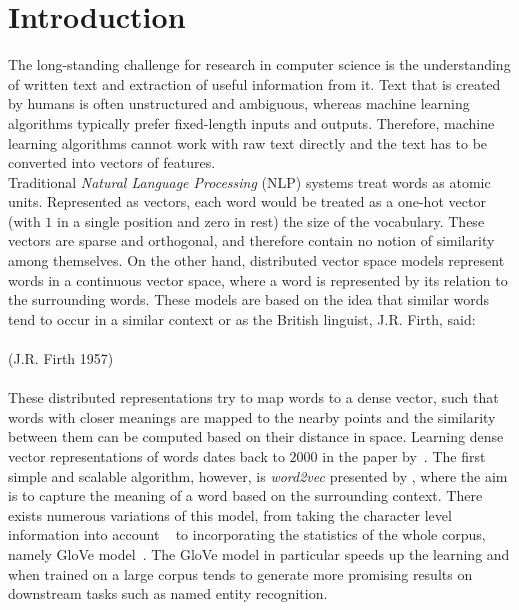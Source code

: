 \chapter{Introduction}\label{chap:intro}
The long-standing challenge for research in computer science is the understanding of written text and extraction of useful information from it. Text that is created by humans is often unstructured and ambiguous, whereas machine learning algorithms typically prefer fixed-length inputs and outputs. Therefore, machine learning algorithms cannot work with raw text directly and the text has to be converted into vectors of features.
\\
Traditional \emph{Natural Language Processing} (NLP) systems treat words as atomic units. Represented as vectors, each word would be treated as a one-hot vector (with $1$ in a single position and zero in rest) the size of the vocabulary. These vectors are sparse and orthogonal, and therefore contain no notion of similarity among themselves. On the other hand, distributed vector space models represent words in a continuous vector space, where a word is represented by its relation to the surrounding words. These models are based on the idea that similar words tend to occur in a similar context or as the British linguist, J.R. Firth, said:\\ \\
\noindent
{} (J.R. Firth 1957)\\
\\
These distributed representations try to map words to a dense vector, such that words with closer meanings are mapped to the nearby points and the similarity between them can be computed based on their distance in space.
Learning dense vector representations of words dates back to $2000$ in the paper by~. The first simple and scalable algorithm, however, is \emph{word2vec} presented by , where the aim is to capture the meaning of a word based on the surrounding context. There exists numerous variations of this model, from taking the character level information into account ~ to incorporating the statistics of the whole corpus, namely GloVe model~. The GloVe model in particular speeds up the learning and when trained on a large corpus tends to generate more promising results on downstream tasks such as named entity recognition.\\


